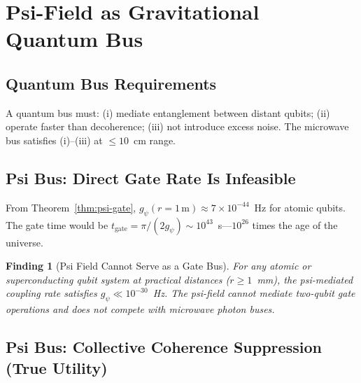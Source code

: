\documentclass[11pt]{article}
\newtheorem{finding}[theorem]{Finding}
\theoremstyle{definition}
\theoremstyle{remark}
\begin{document}
\section{Psi-Field as Gravitational Quantum Bus}
\label{sec:psi-bus}

\subsection{Quantum Bus Requirements}

A quantum bus must: (i) mediate entanglement between distant qubits;
(ii) operate faster than decoherence; (iii) not introduce excess noise.
The microwave bus satisfies (i)--(iii) at $\leq10$~cm range.

\subsection{Psi Bus: Direct Gate Rate Is Infeasible}

From Theorem~\ref{thm:psi-gate}, $g_\psi(r=1\,\mathrm{m}) \approx 7\times10^{-44}$~Hz
for atomic qubits.  The gate time would be $t_{\mathrm{gate}} = \pi/(2g_\psi)
\sim 10^{43}$~s---$10^{26}$ times the age of the universe.

\begin{finding}[Psi Field Cannot Serve as a Gate Bus]
\label{finding:psi-bus-limit}
For any atomic or superconducting qubit system at practical distances
($r \geq 1$~mm), the psi-mediated coupling rate satisfies
$g_\psi \ll 10^{-30}$~Hz.  The psi-field cannot mediate two-qubit gate
operations and does not compete with microwave photon buses.
\end{finding}

\subsection{Psi Bus: Collective Coherence Suppression (True Utility)}
\end{document}
